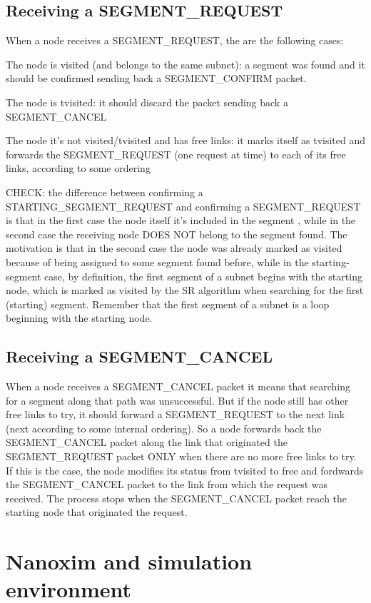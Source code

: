 \documentclass[conference]{IEEEtran}
\begin{document}
\subsection{Receiving a SEGMENT\_REQUEST}
When a node receives a SEGMENT\_REQUEST, the are the following cases:

The node is visited (and belongs to the same subnet): a segment was
found and it should be confirmed sending back a SEGMENT\_CONFIRM
packet.  

The node is tvisited: it should discard the packet sending
back a SEGMENT\_CANCEL 

The node it's not visited/tvisited and has free
links: it marks itself as tvisited and forwards the SEGMENT\_REQUEST
(one request at time) to each of its free links, according to some
ordering

CHECK: the difference between confirming a STARTING\_SEGMENT\_REQUEST
and confirming a SEGMENT\_REQUEST is that in the first case the node
itself it's included in the segment , while in the second case the
receiving node DOES NOT belong to the segment found. The motivation is
that in the second case the node was already marked as visited because
of being assigned to some segment found before, while in the
starting-segment case, by definition, the first segment of a subnet
begins with the starting node, which is marked as visited by the SR
algorithm when searching for the first (starting) segment. Remember
that the first segment of a subnet is a loop beginning with the
starting node. 

\subsection{Receiving a SEGMENT\_CANCEL}
When a node receives a SEGMENT\_CANCEL packet it means that searching
for a segment along that path was unsuccessful. But if the node still
has other free links to try, it should forward a SEGMENT\_REQUEST to
the next link (next according to some internal ordering). So a node
forwards back the SEGMENT\_CANCEL packet along the link that originated
the SEGMENT\_REQUEST packet ONLY when there are no more free links to
try. If this is the case, the node modifies its status from tvisited
to free and fordwards the SEGMENT\_CANCEL packet to the link from which
the request was received. The process stops when the SEGMENT\_CANCEL
packet reach the starting node that originated the request.

\section{Nanoxim and simulation environment}
\end{document}
